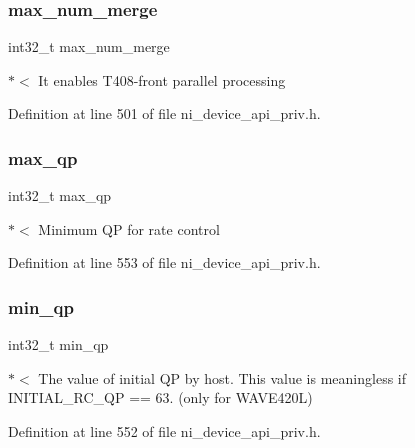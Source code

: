 \subsubsection{\texorpdfstring{max\_num\_merge}{max\_num\_merge}}
{\footnotesize\ttfamily int32\+\_\+t max\+\_\+num\+\_\+merge}

$\ast$$<$ It enables T408-\/front parallel processing 

Definition at line 501 of file ni\+\_\+device\+\_\+api\+\_\+priv.\+h.

\mbox{\label{struct__ni__encoder__change__params__t_ae4e8d31eb2e24cd33744fa0f780f9645}} 
\subsubsection{\texorpdfstring{max\_qp}{max\_qp}}
{\footnotesize\ttfamily int32\+\_\+t max\+\_\+qp}

$\ast$$<$ Minimum QP for rate control 

Definition at line 553 of file ni\+\_\+device\+\_\+api\+\_\+priv.\+h.

\mbox{\label{struct__ni__encoder__change__params__t_ac8af7a54d7a621be72a85fa49e2d5438}} 
\subsubsection{\texorpdfstring{min\_qp}{min\_qp}}
{\footnotesize\ttfamily int32\+\_\+t min\+\_\+qp}

$\ast$$<$ The value of initial QP by host. This value is meaningless if I\+N\+I\+T\+I\+A\+L\+\_\+\+R\+C\+\_\+\+QP == 63. (only for W\+A\+V\+E420L) 

Definition at line 552 of file ni\+\_\+device\+\_\+api\+\_\+priv.\+h.

\mbox{\label{struct__ni__encoder__change__params__t_a33264641bceee9945774af479acfab37}} 
